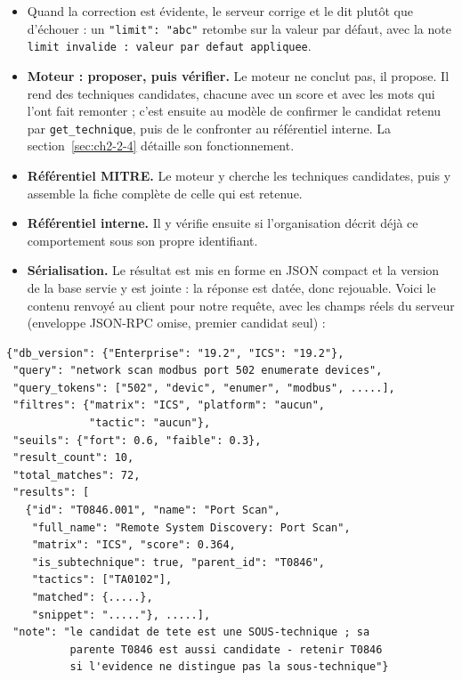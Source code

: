\begin{itemize}
\tightlist
\item
  Quand la correction est évidente, le serveur corrige et le dit plutôt que d'échouer : un \texttt{"limit":\ "abc"} retombe sur la valeur par défaut, avec la note \texttt{limit\ invalide\ :\ valeur\ par\ defaut\ appliquee}.
\item
  \textbf{Moteur : proposer, puis vérifier.} Le moteur ne conclut pas, il propose. Il rend des techniques candidates, chacune avec un score et avec les mots qui l'ont fait remonter ; c'est ensuite au modèle de confirmer le candidat retenu par \texttt{get\_technique}, puis de le confronter au référentiel interne. La section~\ref{sec:ch2-2-4} détaille son fonctionnement.
\item
  \textbf{Référentiel MITRE.} Le moteur y cherche les techniques candidates, puis y assemble la fiche complète de celle qui est retenue.
\item
  \textbf{Référentiel interne.} Il y vérifie ensuite si l'organisation décrit déjà ce comportement sous son propre identifiant.
\item
  \textbf{Sérialisation.} Le résultat est mis en forme en JSON compact et la version de la base servie y est jointe : la réponse est datée, donc rejouable. Voici le contenu renvoyé au client pour notre requête, avec les champs réels du serveur (enveloppe JSON-RPC omise, premier candidat seul) :
\end{itemize}

\begin{verbatim}
{"db_version": {"Enterprise": "19.2", "ICS": "19.2"},
 "query": "network scan modbus port 502 enumerate devices",
 "query_tokens": ["502", "devic", "enumer", "modbus", .....],
 "filtres": {"matrix": "ICS", "platform": "aucun",
             "tactic": "aucun"},
 "seuils": {"fort": 0.6, "faible": 0.3},
 "result_count": 10,
 "total_matches": 72,
 "results": [
   {"id": "T0846.001", "name": "Port Scan",
    "full_name": "Remote System Discovery: Port Scan",
    "matrix": "ICS", "score": 0.364,
    "is_subtechnique": true, "parent_id": "T0846",
    "tactics": ["TA0102"],
    "matched": {.....},
    "snippet": "....."}, .....],
 "note": "le candidat de tete est une SOUS-technique ; sa
          parente T0846 est aussi candidate - retenir T0846
          si l'evidence ne distingue pas la sous-technique"}
\end{verbatim}

